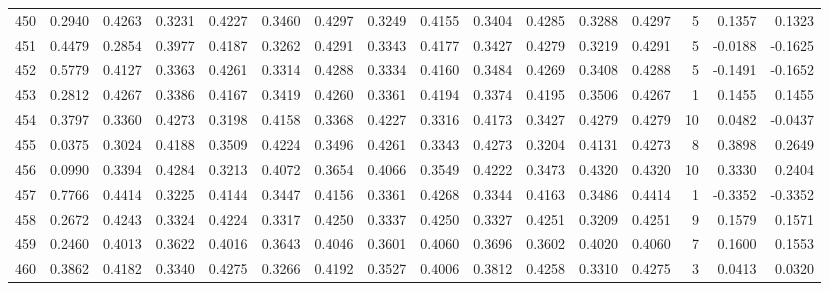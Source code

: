 \begin{tabular}{lrrrrrrrrrrrrrrr}
450 &      0.2940 &  0.4263 &  0.3231 &  0.4227 &  0.3460 &  0.4297 &  0.3249 &  0.4155 &  0.3404 &  0.4285 &   0.3288 &     0.4297 &      5 &                    0.1357 &                     0.1323 \\
451 &      0.4479 &  0.2854 &  0.3977 &  0.4187 &  0.3262 &  0.4291 &  0.3343 &  0.4177 &  0.3427 &  0.4279 &   0.3219 &     0.4291 &      5 &                   -0.0188 &                    -0.1625 \\
452 &      0.5779 &  0.4127 &  0.3363 &  0.4261 &  0.3314 &  0.4288 &  0.3334 &  0.4160 &  0.3484 &  0.4269 &   0.3408 &     0.4288 &      5 &                   -0.1491 &                    -0.1652 \\
453 &      0.2812 &  0.4267 &  0.3386 &  0.4167 &  0.3419 &  0.4260 &  0.3361 &  0.4194 &  0.3374 &  0.4195 &   0.3506 &     0.4267 &      1 &                    0.1455 &                     0.1455 \\
454 &      0.3797 &  0.3360 &  0.4273 &  0.3198 &  0.4158 &  0.3368 &  0.4227 &  0.3316 &  0.4173 &  0.3427 &   0.4279 &     0.4279 &     10 &                    0.0482 &                    -0.0437 \\
455 &      0.0375 &  0.3024 &  0.4188 &  0.3509 &  0.4224 &  0.3496 &  0.4261 &  0.3343 &  0.4273 &  0.3204 &   0.4131 &     0.4273 &      8 &                    0.3898 &                     0.2649 \\
456 &      0.0990 &  0.3394 &  0.4284 &  0.3213 &  0.4072 &  0.3654 &  0.4066 &  0.3549 &  0.4222 &  0.3473 &   0.4320 &     0.4320 &     10 &                    0.3330 &                     0.2404 \\
457 &      0.7766 &  0.4414 &  0.3225 &  0.4144 &  0.3447 &  0.4156 &  0.3361 &  0.4268 &  0.3344 &  0.4163 &   0.3486 &     0.4414 &      1 &                   -0.3352 &                    -0.3352 \\
458 &      0.2672 &  0.4243 &  0.3324 &  0.4224 &  0.3317 &  0.4250 &  0.3337 &  0.4250 &  0.3327 &  0.4251 &   0.3209 &     0.4251 &      9 &                    0.1579 &                     0.1571 \\
459 &      0.2460 &  0.4013 &  0.3622 &  0.4016 &  0.3643 &  0.4046 &  0.3601 &  0.4060 &  0.3696 &  0.3602 &   0.4020 &     0.4060 &      7 &                    0.1600 &                     0.1553 \\
460 &      0.3862 &  0.4182 &  0.3340 &  0.4275 &  0.3266 &  0.4192 &  0.3527 &  0.4006 &  0.3812 &  0.4258 &   0.3310 &     0.4275 &      3 &                    0.0413 &                     0.0320 \\

\end{tabular}
